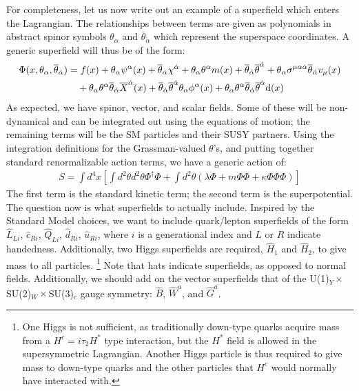 For completeness, let us now write out an example of a superfield which enters the Lagrangian. The relationships between terms are given as polynomials in abstract spinor symbols $\theta_\alpha$ and $\overline{\theta}_{\dot{\alpha}}$ which represent the superspace coordinates. A generic superfield will thus be of the form: \cite[p.~342]{Jungman}
\begin{align}
  \Phi(x, \theta_\alpha, \overline{\theta}_{\dot{\alpha}}) &= f(x) + \theta_\alpha \psi^\alpha(x) + \overline{\theta}_{\dot{\alpha}} \chi^{\dot{\alpha}} + \theta_\alpha \theta^\alpha m(x) + \overline{\theta}_{\dot{\alpha}} \overline{\theta}^{\dot{\alpha}} + \theta_\alpha \sigma^{\mu \alpha \dot{\alpha}} \overline{\theta}_{\dot{\alpha}} v_\mu(x) \nonumber\\
  &\quad + \theta_\alpha \theta^\alpha \overline{\theta}_{\dot{\alpha}} \overline{X}^{\dot{\alpha}}(x) + \overline{\theta}_{\dot{\alpha}} \overline{\theta}^{\dot{\alpha}} \theta_\alpha \phi^\alpha (x) + \theta_\alpha \theta^\alpha \overline{\theta}_{\dot{\alpha}} \overline{\theta}^{\dot{\alpha}}\mathrm{d}(x)
\end{align}
As expected, we have spinor, vector, and scalar fields. Some of these will be non-dynamical and can be integrated out using the equations of motion; the remaining terms will be the SM particles and their SUSY partners. Using the integration definitions for the Grassman-valued $\theta$'s, and putting together standard renormalizable action terms, we have a generic action of: \cite[p.~343]{Jungman}
\begin{align}
  S = \int d^4 x\left[ \int d^2\theta d^2 \theta \Phi^\dagger \Phi + \int d^2\theta \left( \lambda \Phi + m \Phi \Phi + \kappa \Phi \Phi \Phi \right) \right]
\end{align}
The first term is the standard kinetic term; the second term is the superpotential. The question now is what superfields to actually include. Inspired by the Standard Model choices, we want to include quark/lepton superfields of the form $\hat{L}_{Li}$, $\hat{c}_{Ri}$, $\hat{Q}_{Li}$, $\hat{d}_{Ri}$, $\hat{u}_{Ri}$, where $i$ is a generational index and $L$ or $R$ indicate handedness. Additionally, two Higgs superfields are required, $\hat{H}_1$ and $\hat{H}_2$, to give mass to all particles. \footnote{One Higgs is not sufficient, as traditionally down-type quarks acquire mass from a $H^c = i \tau_2 H^*$ type interaction, but the $H^*$ field is allowed in the supersymmetric Lagrangian. Another Higgs particle is thus required to give mass to down-type quarks and the other particles that $H^c$ would normally have interacted with.} Note that hats indicate superfields, as opposed to normal fields. Additionally, we should add on the vector superfields that of the U(1)$_Y\times$SU(2)$_W\times$SU(3)$_c$ gauge symmetry: $\hat{B}$, $\hat{W}^a$, and $\hat{G}^a$. \cite[p.~344]{Jungman}

